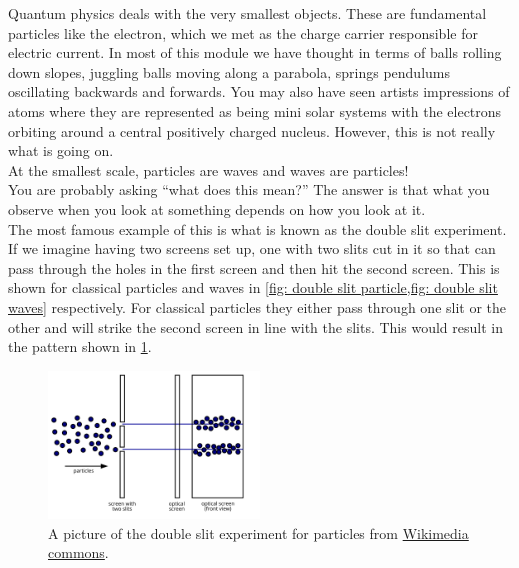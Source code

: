 \documentclass[a4paper,12pt]{book}
\begin{document}
Quantum physics deals with the very smallest objects. These are fundamental particles like the electron, which we met as the charge carrier responsible for electric current. In most of this module we have thought in terms of balls rolling down slopes, juggling balls moving along a parabola, springs pendulums oscillating backwards and forwards. You may also have seen artists impressions of atoms where they are represented as being mini solar systems with the electrons orbiting around a central positively charged nucleus.  However, this is not really what is going on.\\

At the smallest scale, particles are waves and waves are particles!\\

You are probably asking ``what does this mean?'' The answer is that what you observe when you look at something depends on how you look at it. \\

The most famous example of this is what is known as the double slit experiment. If we imagine having two screens set up, one with two slits cut in it so that can pass through the holes in the first screen and then hit the second screen. This is shown for classical particles and waves in \cref{fig: double slit particle,fig: double slit waves} respectively. For classical particles they either pass through one slit or the other and will strike the second screen in line with the slits. This would result in the pattern shown in \cref{fig: double slit particle}.\\

\begin{figure}[ht]
    \centering
   \includegraphics[width=0.5\textwidth]{figures/Two-Slit_Experiment_Particles.png}
    \caption{A picture of the double slit experiment for particles from \href{https://commons.wikimedia.org/wiki/File:Two-Slit_Experiment_Particles.svg}{Wikimedia commons}.}
    \label{fig: double slit particle}
\end{figure}
\end{document}
